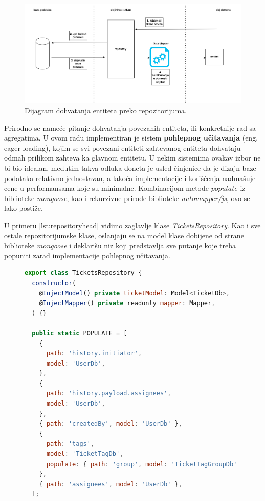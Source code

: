 \documentclass[12pt,oneside]{memoir}
\begin{document}
\begin{figure}[h]
  \centering
  \includegraphics[width=1\textwidth]{docs/images/ch_2/repository.png} 
  \caption{Dijagram dohvatanja entiteta preko repozitorijuma.}
  \label{fig:sample}
\end{figure}

Prirodno se nameće pitanje dohvatanja povezanih entiteta, ili konkretnije rad sa agregatima. U ovom radu implementiran je sistem \textbf{pohlepnog učitavanja} (eng. eager loading), kojim se svi povezani entiteti zahtevanog entiteta dohvataju odmah prilikom zahteva ka glavnom entitetu. U nekim sistemima ovakav izbor ne bi bio idealan, međutim takva odluka doneta je usled činjenice da je dizajn baze podataka relativno jednostavan, a lakoća implementacije i korišćenja nadmašuje cene u performansama koje su minimalne. Kombinacijom metode $populate$ 
 iz biblioteke \textit{mongoose}, kao i rekurzivne prirode biblioteke \textit{automapper/js}, ovo se lako postiže.

U primeru \ref{lst:repositoryhead} vidimo zaglavlje klase \textit{TicketsRepository}. Kao i sve ostale repozitorijumske klase, oslanjaju se na model klase dobijene od strane biblioteke \textit{mongoose} i deklarišu niz koji predstavlja sve putanje koje treba popuniti zarad implementacije pohlepnog učitavanja.

\begin{figure}[h]
\begin{lstlisting}[language=JavaScript, style=ES6, caption={Repozitorijum tiketa, konstrukcija i niz POPULATE.}, label={lst:repositoryhead}]
export class TicketsRepository {
  constructor(
    @InjectModel() private ticketModel: Model<TicketDb>,
    @InjectMapper() private readonly mapper: Mapper,
  ) {}

  public static POPULATE = [
    {
      path: 'history.initiator',
      model: 'UserDb',
    },
    {
      path: 'history.payload.assignees',
      model: 'UserDb',
    },
    { path: 'createdBy', model: 'UserDb' },
    {
      path: 'tags',
      model: 'TicketTagDb',
      populate: { path: 'group', model: 'TicketTagGroupDb' },
    },
    { path: 'assignees', model: 'UserDb' },
  ];
\end{lstlisting}
\end{figure}
\end{document}
